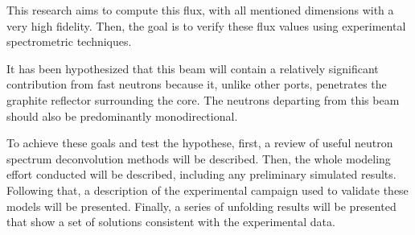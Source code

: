 This research aims to compute this flux, with all mentioned dimensions with a very high fidelity.
Then, the goal is to verify these flux values using experimental spectrometric techniques.

It has been hypothesized that this beam will contain a relatively significant contribution from fast neutrons because it, unlike other ports, penetrates the graphite reflector surrounding the core.
The neutrons departing from this beam should also be predominantly monodirectional.

To achieve these goals and test the hypothese, first, a review of useful neutron spectrum deconvolution methods will be described.
Then, the whole modeling effort conducted will be described, including any preliminary simulated results.
Following that, a description of the experimental campaign used to validate these models will be presented.
Finally, a series of unfolding results will be presented that show a set of solutions consistent with the experimental data.


